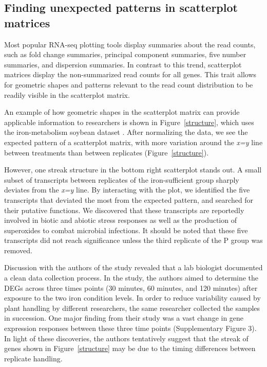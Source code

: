 \documentclass{bioinfo}
\begin{document}
\subsection{Finding unexpected patterns in scatterplot matrices}

Most popular RNA-seq plotting tools display summaries about the read counts, such as fold change summaries, principal component summaries, five number summaries, and dispersion summaries. In contrast to this trend, scatterplot matrices display the non-summarized read counts for all genes. This trait allows for geometric shapes and patterns relevant to the read count distribution to be readily visible in the scatterplot matrix.

An example of how geometric shapes in the scatterplot matrix can provide applicable information to researchers is shown in Figure~\ref{structure}, which uses the iron-metabolism soybean dataset \citep{Lauter16}. After normalizing the data, we see the expected pattern of a scatterplot matrix, with more variation around the \textit{x=y} line between treatments than between replicates (Figure~\ref{structure}).

However, one streak structure in the bottom right scatterplot stands out. A small subset of transcripts between replicates of the iron-sufficient group sharply deviates from the \textit{x=y} line. By interacting with the plot, we identified the five transcripts that deviated the most from the expected pattern, and searched for their putative functions. We discovered that these transcripts are reportedly involved in biotic and abiotic stress responses as well as the production of superoxides to combat microbial infections. It should be noted that these five transcripts did not reach significance unless the third replicate of the P group was removed.

Discussion with the authors of the study revealed that a lab biologist documented a clean data collection process. In the study, the authors aimed to determine the DEGs across three times points (30 minutes, 60 minutes, and 120 minutes) after exposure to the two iron condition levels. In order to reduce variability caused by plant handling by different researchers, the same researcher collected the samples in succession. One major finding from their study was a vast change in gene expression responses between these three time points (Supplementary Figure 3). In light of these discoveries, the authors tentatively suggest that the streak of genes shown in Figure~\ref{structure} may be due to the timing differences between replicate handling.
\end{document}
